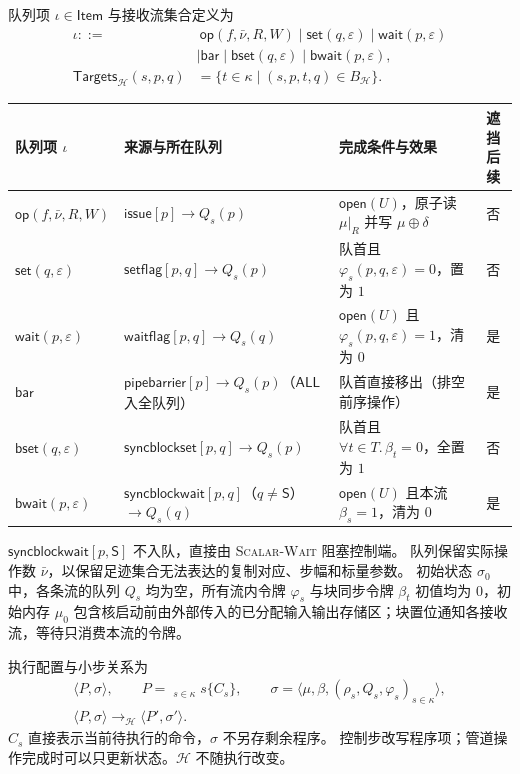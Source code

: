 \documentclass[UTF8,a4paper,11pt,fontset=fandol]{ctexart}
\newcommand{\kw}[1]{\ensuremath{\mathsf{#1}}}
\begin{document}
队列项 $\iota\in\mathsf{Item}$ 与接收流集合定义为
\[
\begin{aligned}
\iota ::={}
  &\ \kw{op}(f,\bar\nu,R,W)
   \mid \kw{set}(q,\varepsilon)
   \mid \kw{wait}(p,\varepsilon)\\
  &\mid \kw{bar}
   \mid \kw{bset}(q,\varepsilon)
   \mid \kw{bwait}(p,\varepsilon),\\[0.4em]
\mathsf{Targets}_{\mathcal H}(s,p,q)
  & =\{t\in\kappa\mid(s,p,t,q)\in B_{\mathcal H}\}.
\end{aligned}
\]
\begin{center}\small
\begin{tabularx}{\linewidth}{@{}l l Y c@{}}
\toprule
队列项 $\iota$ & 来源与所在队列 & 完成条件与效果 & 遮挡后续 \\
\midrule
$\kw{op}(f,\bar\nu,R,W)$ & $\kw{issue}[p]\to Q_s(p)$ & $\mathsf{open}(U)$，原子读 $\mu|_R$ 并写 $\mu\oplus\delta$ & 否 \\
$\kw{set}(q,\varepsilon)$ & $\kw{setflag}[p,q]\to Q_s(p)$ & 队首且 $\varphi_s(p,q,\varepsilon)=0$，置为 $1$ & 否 \\
$\kw{wait}(p,\varepsilon)$ & $\kw{waitflag}[p,q]\to Q_s(q)$ & $\mathsf{open}(U)$ 且 $\varphi_s(p,q,\varepsilon)=1$，清为 $0$ & 是 \\
$\kw{bar}$ & $\kw{pipebarrier}[p]\to Q_s(p)$（$\mathsf{ALL}$ 入全队列） & 队首直接移出（排空前序操作） & 是 \\
$\kw{bset}(q,\varepsilon)$ & $\kw{syncblockset}[p,q]\to Q_s(p)$ & 队首且 $\forall t\in T.\,\beta_t=0$，全置为 $1$ & 否 \\
$\kw{bwait}(p,\varepsilon)$ & $\kw{syncblockwait}[p,q]$（$q\ne\mathsf S$）$\to Q_s(q)$ & $\mathsf{open}(U)$ 且本流 $\beta_s=1$，清为 $0$ & 是 \\
\bottomrule
\end{tabularx}
\end{center}
$\kw{syncblockwait}[p,\mathsf S]$ 不入队，直接由 \textsc{Scalar-Wait} 阻塞控制端。
队列保留实际操作数 $\bar\nu$，以保留足迹集合无法表达的复制对应、步幅和标量参数。
初始状态 $\sigma_0$ 中，各条流的队列 $Q_s$ 均为空，所有流内令牌 $\varphi_s$ 与块同步令牌 $\beta_t$ 初值均为 $0$，初始内存 $\mu_0$ 包含核启动前由外部传入的已分配输入输出存储区；块置位通知各接收流，等待只消费本流的令牌。

执行配置与小步关系为
\[
\begin{gathered}
\langle P,\sigma\rangle,\qquad
P=\mathop{\Big\|}_{s\in\kappa}s\{C_s\},\qquad
\sigma=\langle\mu,\beta,(\rho_s,Q_s,\varphi_s)_{s\in\kappa}\rangle,\\
\langle P,\sigma\rangle\longrightarrow_{\mathcal H}\langle P',\sigma'\rangle.
\end{gathered}
\]
$C_s$ 直接表示当前待执行的命令，$\sigma$ 不另存剩余程序。
控制步改写程序项；管道操作完成时可以只更新状态。$\mathcal H$ 不随执行改变。
\end{document}
